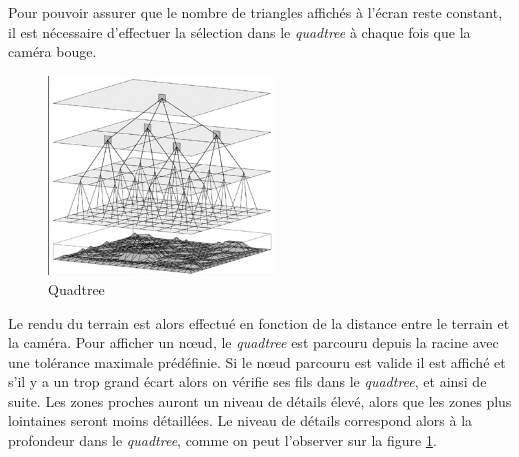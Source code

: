     Pour pouvoir assurer que le nombre de triangles affichés à l'écran reste constant, il est nécessaire d'effectuer la sélection dans le \emph{quadtree} à chaque fois que la caméra bouge.\\
    \vspace{0.5cm}
    \begin{figure}
 \includegraphics[width=6cm]{img/quadtree.png}
   \caption[Quadtree]{Quadtree\protect\footnotemark}
   \label{fig:quadtree-selection}
 \end{figure}
    Le rendu du terrain est alors effectué en fonction de la distance entre le terrain et la caméra. Pour afficher un n\oe{}ud, le \emph{quadtree} est parcouru depuis la racine avec une tolérance maximale prédéfinie. Si le n\oe{}ud parcouru est valide il est affiché et s'il y a un trop grand écart alors on vérifie ses fils dans le \emph{quadtree}, et ainsi de suite. Les zones proches auront un niveau de détails élevé, alors que les zones plus lointaines seront moins détaillées. Le niveau de détails correspond alors à la profondeur dans le \emph{quadtree}, comme on peut l'observer sur la figure \ref{fig:quadtree-selection}.

\newpage

